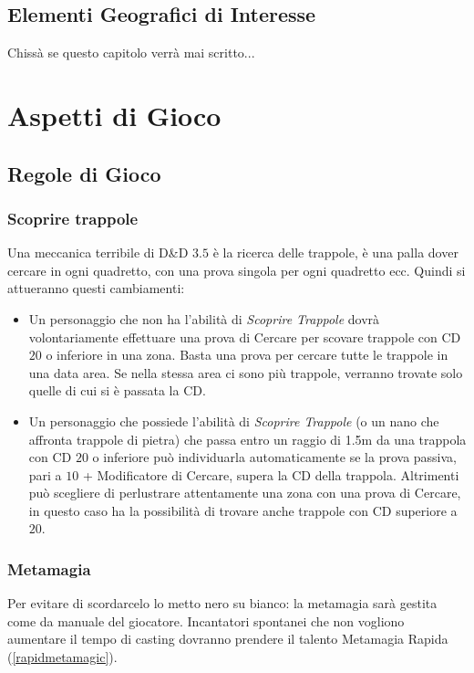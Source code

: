 \documentclass[10pt, a4paper]{report}
\newcommand{\partimagefile}{}
\newcommand{\partimage}[1]{%
	\renewcommand{\partimagefile}{#1}%
}
\begin{document}
\chapter{Elementi Geografici di Interesse}
Chissà se questo capitolo verrà mai scritto...

\partimage{giocopart.png}
\part{Aspetti di Gioco}

\chapter{Regole di Gioco}
\begin{multicols}{2}

\section{Scoprire trappole}
Una meccanica terribile di D\&D $3.5$ è la ricerca delle trappole, è una palla dover cercare in ogni quadretto, con una prova singola per ogni quadretto ecc.
Quindi si attueranno questi cambiamenti:
\begin{itemize}
	\item Un personaggio che non ha l'abilità di \textit{Scoprire Trappole} dovrà volontariamente effettuare una prova di Cercare per scovare trappole con CD $20$ o inferiore in una zona. Basta una prova per cercare tutte le trappole in una data area. Se nella stessa area ci sono più trappole, verranno trovate solo quelle di cui si è passata la CD.
	\item Un personaggio che possiede l'abilità di \textit{Scoprire Trappole} (o un nano che affronta trappole di pietra) che passa entro un raggio di 1.5m da una trappola con CD $20$ o inferiore può individuarla automaticamente se la prova passiva, pari a $10$ + Modificatore di Cercare, supera la CD della trappola. Altrimenti può scegliere di perlustrare attentamente una zona con una prova di Cercare, in questo caso ha la possibilità di trovare anche trappole con CD superiore a $20$.
\end{itemize}

\section{Metamagia}
Per evitare di scordarcelo lo metto nero su bianco: la metamagia sarà gestita come da manuale del giocatore. Incantatori spontanei che non vogliono aumentare il tempo di casting dovranno prendere il talento Metamagia Rapida (\ref{rapidmetamagic}).

\end{multicols}
\end{document}
